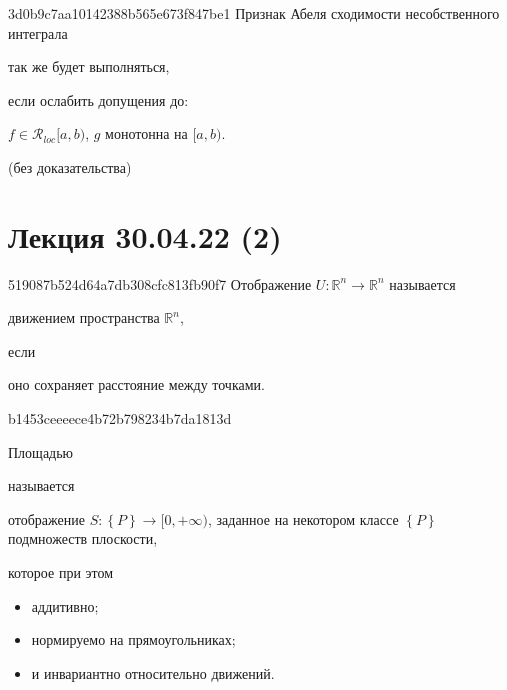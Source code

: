 \begin{note}{3d0b9c7aa10142388b565e673f847be1}
    Признак Абеля сходимости несобственного интеграла \begin{icloze}{2}так же будет выполняться,\end{icloze} если ослабить допущения до:
    \begin{icloze}{1}
        \begin{center}
            \({ f \in \mathcal R_{loc}[a, b) }\), \qquad \({ g }\) монотонна на \({ [a, b) }\).
        \end{center}
    \end{icloze}

    \begin{center}
        \tiny
        (без доказательства)
    \end{center}
\end{note}

\section{Лекция 30.04.22 (2)}
\begin{note}{519087b524d64a7db308cfc813fb90f7}
    Отображение \({ U : \mathbb R^{n} \to \mathbb R^{n} }\) называется \begin{icloze}{2}движением пространства \({ \mathbb R^{n} }\),\end{icloze} если \begin{icloze}{1}оно сохраняет расстояние между точками.\end{icloze}
\end{note}

\begin{note}{b1453ceeeece4b72b798234b7da1813d}
    \begin{icloze}{3}Площадью\end{icloze} называется \begin{icloze}{1}отображение \({ S : \left\{ P \right\} \to [0, +\infty) }\), заданное на некотором классе \({ \left\{ P \right\} }\) подмножеств плоскости,\end{icloze} которое при этом
    \begin{icloze}{2}
        \begin{itemize}
            \item аддитивно;
            \item нормируемо на прямоугольниках;
            \item и инвариантно относительно движений.
        \end{itemize}
    \end{icloze}
\end{note}

